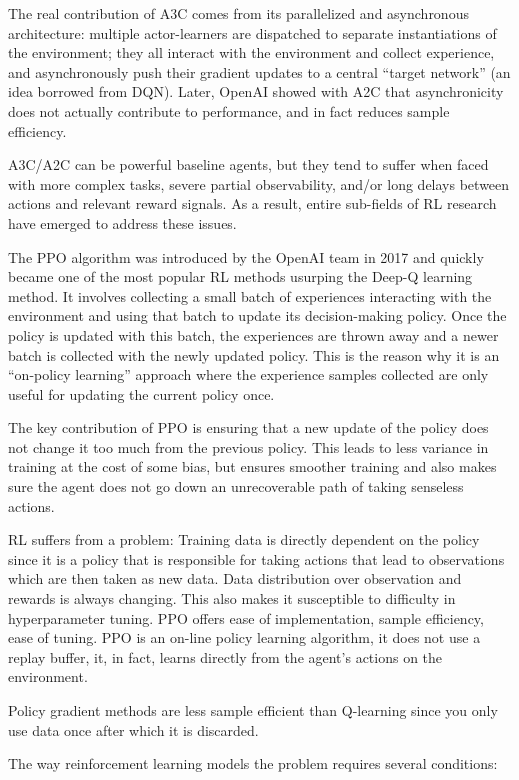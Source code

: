 \documentclass[conference]{IEEEtran}
\begin{document}
The real contribution of A3C comes from its parallelized and asynchronous architecture: multiple actor-learners are dispatched to separate instantiations of the environment; they all interact with the environment and collect experience, and asynchronously push their gradient updates to a central “target network” (an idea borrowed from DQN). Later, OpenAI showed with A2C that asynchronicity does not actually contribute to performance, and in fact reduces sample efficiency.

A3C/A2C can be powerful baseline agents, but they tend to suffer when faced with more complex tasks, severe partial observability, and/or long delays between actions and relevant reward signals. As a result, entire sub-fields of RL research have emerged to address these issues.

The PPO algorithm was introduced by the OpenAI team in 2017 and quickly became one of the most popular RL methods usurping the Deep-Q learning method. It involves collecting a small batch of experiences interacting with the environment and using that batch to update its decision-making policy. Once the policy is updated with this batch, the experiences are thrown away and a newer batch is collected with the newly updated policy. This is the reason why it is an “on-policy learning” approach where the experience samples collected are only useful for updating the current policy once.

The key contribution of PPO is ensuring that a new update of the policy does not change it too much from the previous policy. This leads to less variance in training at the cost of some bias, but ensures smoother training and also makes sure the agent does not go down an unrecoverable path of taking senseless actions.

RL suffers from a problem: Training data is directly dependent on the policy since it is a policy that is responsible for taking actions that lead to observations which are then taken as new data. Data distribution over observation and rewards is always changing. This also makes it susceptible to difficulty in hyperparameter tuning. PPO offers ease of implementation, sample efficiency, ease of tuning. PPO is an on-line policy learning algorithm, it does not use a replay buffer, it, in fact,  learns directly from the agent’s actions on the environment.

Policy gradient methods are less sample efficient than Q-learning since you only use data once after which it is discarded.

The way reinforcement learning models the problem requires several conditions:
\end{document}
